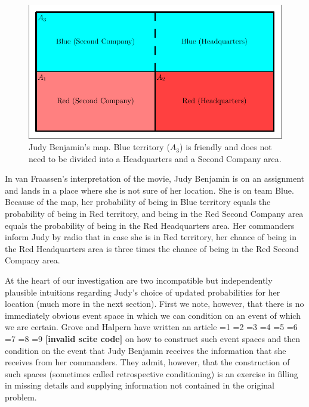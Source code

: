 \documentclass[smallextended]{svjour3}       %
\newcommand{\PageP}{p.~}
\newcommand{\PageP}{}
\newcommand{\scite}[3]{\ifnum#1=1\cite{#2}\else
\ifnum#1=2\cite[{\PageP}~#3]{#2}\else
\ifnum#1=3\cite[{\PageP}~#3]{#2}\else
\ifnum#1=4\cite{#2}\else
\ifnum#1=5\cite{#2}\else
\ifnum#1=6\cite[{\PageP}~#3]{#2}\else
\ifnum#1=7\cite{#2}\else
\ifnum#1=8\cite[{\PageP}~#3]{#2}\else
\ifnum#1=9\cite[{\PageP}~#3]{#2}\else
\textbf{[invalid scite code]}\fi\fi\fi\fi\fi\fi\fi\fi\fi}
\begin{document}
\begin{figure}[h]
  \begin{flushright}
    \begin{minipage}[h]{.8\linewidth}
      \includegraphics[width=\textwidth]{judy.pdf}
      \caption{Judy Benjamin's map. Blue territory ($A_{3}$) is friendly and
        does not need to be divided into a Headquarters and a Second
        Company area.}
      \label{fig:map}
    \end{minipage}
  \end{flushright}
\end{figure}

In van Fraassen's interpretation of the movie, Judy Benjamin is on an
assignment and lands in a place where she is not sure of her location.
She is on team Blue. Because of the map, her probability of being in
Blue territory equals the probability of being in Red territory, and
being in the Red Second Company area equals the probability of being
in the Red Headquarters area. Her commanders inform Judy by radio that
in case she is in Red territory, her chance of being in the Red
Headquarters area is three times the chance of being in the Red Second
Company area.

At the heart of our investigation are two incompatible but independently
plausible intuitions regarding Judy's choice of updated probabilities for her
location (much more in the next section). First we note, however, that there
is no immediately obvious event space in which we can condition on an event
of which we are certain. Grove and Halpern have written an article
\scite{1}{grovehalpern97}{} on how to construct such event spaces and then
condition on the event that Judy Benjamin receives the information that she
receives from her commanders. They admit, however, that the construction of
such spaces (sometimes called retrospective conditioning) is an exercise in
filling in missing details and supplying information not contained in the
original problem.
\end{document}
